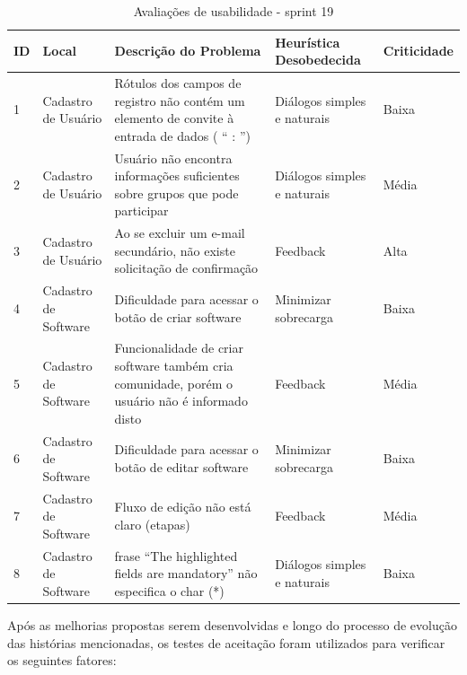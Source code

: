 \begin{table}[h!]
\label{tabela2a}
\begin{tabular}{|l|p{3cm}|p{6cm}|p{3cm}|l|}
\hline
\textbf{ID} & \textbf{Local} & \textbf{Descrição do Problema}                                                                                     & \textbf{Heurística Desobedecida} & \textbf{Criticidade} \\ \hline
1           & Cadastro de Usuário                 & Rótulos dos campos de registro não contém um elemento de convite à entrada de dados ( “ : ”) & Diálogos simples e naturais     & Baixa                \\ \hline
2           & Cadastro de Usuário                 & Usuário não encontra informações suficientes sobre grupos que pode participar  & Diálogos simples e naturais             & Média                \\ \hline
3           & Cadastro de Usuário               & Ao se excluir um e-mail secundário, não existe solicitação de confirmação       & Feedback                & Alta                \\ \hline
4           & Cadastro de Software     & Dificuldade para acessar o botão de criar software
	        & Minimizar sobrecarga          & Baixa                \\ \hline
5           & Cadastro de Software       & Funcionalidade de criar software também cria comunidade, porém o usuário não é informado disto  & Feedback    & Média                \\ \hline
6           & Cadastro de Software    & Dificuldade para acessar o botão de editar software
		    & Minimizar sobrecarga           & Baixa                \\ \hline
7           & Cadastro de Software    & Fluxo de edição não está claro (etapas)
			& Feedback                       & Média                \\ \hline
8           & Cadastro de Software    & frase ``The highlighted fields are mandatory'' não especifica o char (*)
		    &Diálogos simples e naturais     & Baixa                \\ \hline
\end{tabular}
\caption{Avaliações de usabilidade - sprint 19}
\end{table}

Após as melhorias propostas serem desenvolvidas e longo do processo de evolução das histórias mencionadas, os testes de aceitação foram utilizados para verificar os seguintes fatores:

